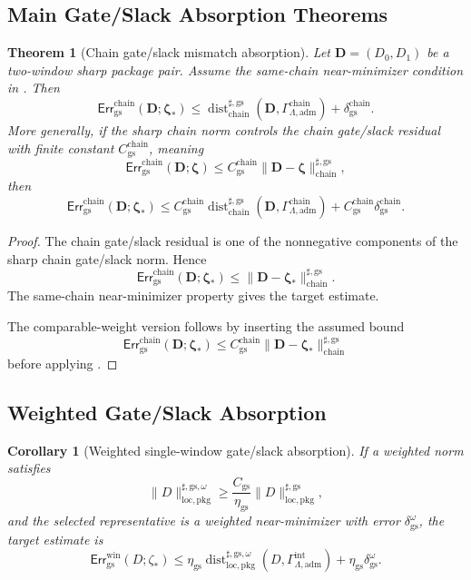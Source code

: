 \documentclass[11pt]{article}
\numberwithin{equation}{section}
\newtheorem{theorem}{Theorem}[section]
\newtheorem{corollary}[corollary]{Corollary}
\theoremstyle{definition}
\theoremstyle{remark}
\newcommand{\loc}{\mathrm{loc}}
\newcommand{\pkg}{\mathrm{pkg}}
\newcommand{\adm}{\mathrm{adm}}
\newcommand{\gs}{\mathrm{gs}}
\newcommand{\chain}{\mathrm{chain}}
\newcommand{\Err}{\mathsf{Err}}
\newcommand{\Dist}{\operatorname{dist}}
\newcommand{\bD}{\mathbf D}
\newcommand{\bzeta}{\boldsymbol\zeta}
\newcommand{\Gint}{\Gamma_{\Lambda,\adm}^{\mathrm{int}}}
\newcommand{\Gchain}{\Gamma_{\Lambda,\adm}^{\chain}}
\begin{document}
\subsection{Main Gate/Slack Absorption Theorems}
\label{gs:sec:main-targets}

\begin{theorem}[Chain gate/slack mismatch absorption]
\label{gs:thm:chain-gs-absorption-target}
Let \(\bD=(D_0,D_1)\) be a two-window sharp package pair.  Assume the
same-chain near-minimizer condition in .  Then
\[
    \Err_{\gs}^{\chain}(\bD;\bzeta_*)
    \le
    \Dist_{\chain}^{\sharp,\gs}(\bD,\Gchain)
    +
    \delta_{\gs}^{\chain}.
\]
More generally, if the sharp chain norm controls the chain gate/slack residual
with finite constant \(C_{\gs}^{\chain}\), meaning
\[
    \Err_{\gs}^{\chain}(\bD;\bzeta)
    \le
    C_{\gs}^{\chain}\|\bD-\bzeta\|_{\chain}^{\sharp,\gs},
\]
then
\[
    \Err_{\gs}^{\chain}(\bD;\bzeta_*)
    \le
    C_{\gs}^{\chain}
    \Dist_{\chain}^{\sharp,\gs}(\bD,\Gchain)
    +
    C_{\gs}^{\chain}\delta_{\gs}^{\chain}.
\]
\end{theorem}

\begin{proof}
The chain gate/slack residual is one of the nonnegative components of the
sharp chain gate/slack norm.  Hence
\[
    \Err_{\gs}^{\chain}(\bD;\bzeta_*)
    \le
    \|\bD-\bzeta_*\|_{\chain}^{\sharp,\gs}.
\]
The same-chain near-minimizer property gives the target estimate.

The comparable-weight version follows by inserting the assumed bound
\[
    \Err_{\gs}^{\chain}(\bD;\bzeta_*)
    \le
    C_{\gs}^{\chain}\|\bD-\bzeta_*\|_{\chain}^{\sharp,\gs}
\]
before applying .
\end{proof}

\subsection{Weighted Gate/Slack Absorption}
\label{gs:sec:weighted}

\begin{corollary}[Weighted single-window gate/slack absorption]
\label{gs:cor:weighted-single-window-gs-target}
If a weighted norm satisfies
\[
    \|D\|_{\loc,\pkg}^{\sharp,\gs,\omega}
    \ge
    \frac{C_{\gs}}{\eta_{\gs}}
    \|D\|_{\loc,\pkg}^{\sharp,\gs},
\]
and the selected representative is a weighted near-minimizer with error
\(\delta_{\gs}^{\omega}\), the target estimate is
\[
    \Err_{\gs}^{\mathrm{win}}(D;\zeta_*)
    \le
    \eta_{\gs}
    \Dist_{\loc,\pkg}^{\sharp,\gs,\omega}(D,\Gint)
    +
    \eta_{\gs}\delta_{\gs}^{\omega}.
\]
\end{corollary}
\end{document}
